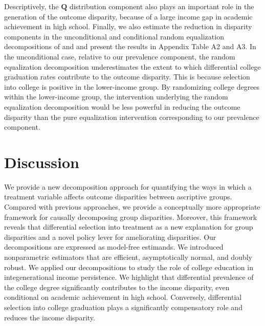 \documentclass[12pt,a4paper]{article}
\def\Q{{\boldsymbol Q}}
\begin{document}
Descriptively, the $\Q$ distribution component also plays an important role in the generation of the outcome disparity, because of a large income gap in academic achievement in high school. Finally, we also estimate the reduction in disparity components in the unconditional and conditional random equalization decompositions of \citet{jackson_decomposition_2018} and \citet{jackson_meaningful_2021} and present the results in Appendix Table A2 and A3. In the unconditional case, relative to our prevalence component, the random equalization decomposition underestimates the extent to which differential college graduation rates contribute to the outcome disparity. This is because selection into college is positive in the lower-income group. By randomizing college degrees within the lower-income group, the intervention underlying the random equalization decomposition would be less powerful in reducing the outcome disparity than the pure equalization intervention corresponding to our prevalence component. 

\section{Discussion}
We provide a new decomposition approach for quantifying the ways in which a treatment variable affects outcome disparities between ascriptive groups. Compared with previous approaches, we provide a conceptually more appropriate framework for causally decomposing group disparities. Moreover, this framework reveals that differential selection into treatment as a new explanation for group disparities and a novel policy lever for ameliorating disparities. Our decompositions are expressed as model-free estimands. We introduced nonparametric estimators that are efficient, asymptotically normal, and doubly robust. We applied our decompositions to study the role of college education in integenerational income persistence. We highlight that differential prevalence of the college degree significantly contributes to the income disparity, even conditional on academic achievement in high school. Conversely, differential selection into college graduation plays a significantly compensatory role and reduces the income disparity.
\end{document}
